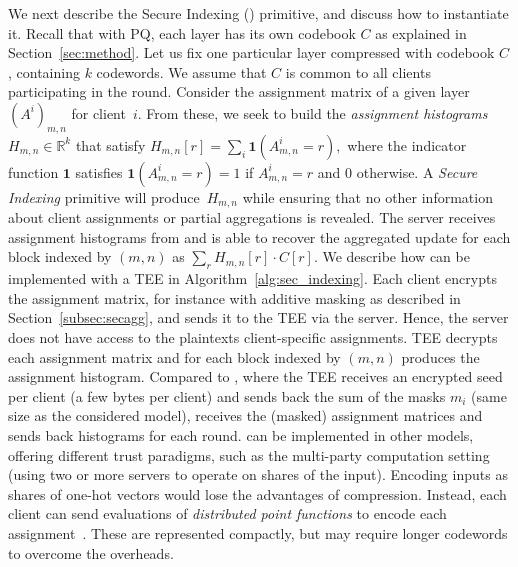We next describe the Secure Indexing (\SecInd) primitive, and discuss how to instantiate it.
Recall that with PQ, each layer has its own codebook $C$ as explained in Section~\ref{sec:method}.
Let us fix one particular layer compressed with codebook $C$, containing $k$ codewords.
We assume that $C$ is common to all clients participating in the round.
Consider the assignment matrix of a given layer $(A^i)_{m,n}$ for client~$i$.
From these, we seek to build the \emph{assignment histograms} $H_{m,n} \in \mathbb R^k$ that satisfy
$H_{m,n}[r] = \sum_i \mathbf 1\left(A^i_{m,n} = r\right),$
where the indicator function $\mathbf 1$ satisfies $\mathbf 1\left(A^i_{m,n} = r\right) = 1$ if $A^i_{m,n} = r$ and $0$ otherwise.
A \emph{Secure Indexing} primitive will produce~$H_{m,n}$ while ensuring that no other information about client assignments or partial aggregations is revealed.
The server receives assignment histograms from \SecInd and is able to recover the aggregated update for each block indexed by $(m, n)$ as
$
        \sum_r  H_{m,n}[r] \cdot C[r].
$
%
We describe how \SecInd can be implemented with a TEE in Algorithm~\ref{alg:sec_indexing}.
Each client encrypts the assignment matrix, for instance with additive masking as described in Section~\ref{subsec:secagg}, and sends it to the TEE via the server.
Hence, the server does not have access to the plaintexts client-specific assignments.
TEE decrypts each assignment matrix and for each block indexed by $(m, n)$ produces the assignment histogram.
Compared to \SecAgg, where the TEE receives an encrypted seed per client (a few bytes per client) and sends back the sum of the masks $m_i$ (same size as the considered model), \SecInd receives the (masked) assignment matrices and sends back histograms for each round.
\SecInd can be implemented in other models, offering different trust paradigms,
such as the multi-party computation setting (using two or more servers to operate on shares of the input).
Encoding inputs as shares of one-hot vectors would lose the advantages of compression.
Instead, each client can send evaluations of \emph{distributed point functions} to encode each assignment~\cite{boyle16}.
These are represented compactly, but may require longer codewords to overcome the overheads.

